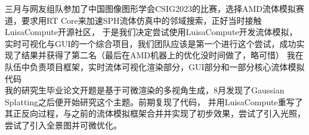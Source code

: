 \begin{minipage}[c]{\rightcolwidth}
    {三月与网友组队参加了中国图像图形学会CSIG2023的比赛，选择AMD流体模拟赛道，要求用RT Core来加速SPH流体仿真中的邻域搜索，正好当时接触LuisaCompute开源社区，
    于是我们决定尝试使用LuisaCompute开发流体模拟，实时可视化与GUI的一个综合项目，我们团队应该是第一个进行这个尝试，成功实现了结果并获得了第二名（最后在AMD机器上的优化没时间做了，略可惜）
    我在队伍中负责项目框架，实时流体可视化渲染部分，GUI部分和一部分核心流体模拟代码}
    \vspace{\itemspace}\\
    {我的研究生毕业论文开题是基于可微渲染的多视角生成，8月发现了Gaussian Splatting之后便开始研究这个主题。前期复现了代码，
    并用LuisaCompute重写了其正反向过程，与之前的流体模拟框架合并并实现了初步效果，尝试了引入光照，尝试了引入全景图并可微优化。}
    \vspace{\itemspace}\\
\end{minipage}